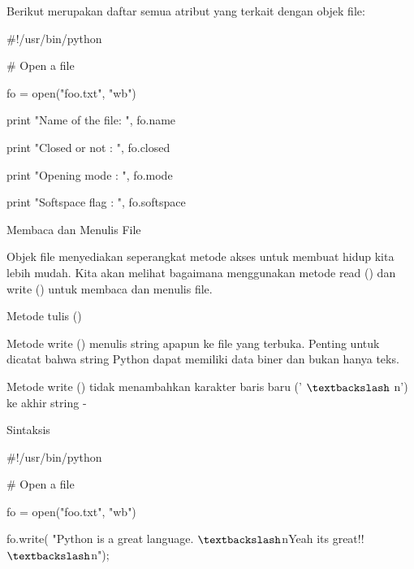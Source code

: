 \vspace{12pt}
\noindent 
Berikut merupakan daftar semua atribut yang terkait dengan objek file: \par
\vspace{16pt}
\vspace{16pt}
\vspace{16pt}
\noindent 
 $  \#  $!/usr/bin/python \par
\vspace{12pt}
\noindent 
 $  \#  $ Open a file \par
\noindent 
fo = open("foo.txt", "wb") \par
\noindent 
print "Name of the file: ", fo.name \par
\noindent 
print "Closed or not : ", fo.closed \par
\noindent 
print "Opening mode : ", fo.mode \par
\noindent 
print "Softspace flag : ", fo.softspace \par
\vspace{12pt}
\noindent 
Membaca dan Menulis File \par
\vspace{12pt}
\noindent 
Objek file menyediakan seperangkat metode akses untuk membuat hidup kita lebih mudah. Kita akan melihat bagaimana menggunakan metode read () dan write () untuk membaca dan menulis file. \par
\noindent 
Metode tulis () \par
\vspace{12pt}
\noindent 
Metode write () menulis string apapun ke file yang terbuka. Penting untuk dicatat bahwa string Python dapat memiliki data biner dan bukan hanya teks. \par
\vspace{12pt}
\noindent 
Metode write () tidak menambahkan karakter baris baru (' $  \textbackslash  $ n') ke akhir string - \par
\noindent 
Sintaksis \par
\vspace{12pt}
\noindent 
 $  \#  $!/usr/bin/python \par
\vspace{12pt}
\noindent 
 $  \#  $ Open a file \par
\noindent 
fo = open("foo.txt", "wb") \par
\noindent 
fo.write( "Python is a great language. $  \textbackslash  $nYeah its great!! $  \textbackslash  $n"); \par
\vspace{12pt}
